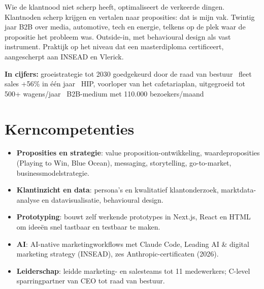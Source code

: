 \documentclass[11pt,a4paper,sans]{moderncv}
\begin{document}
\makecvtitle


\vspace{6pt}
\small{Wie de klantnood niet scherp heeft, optimaliseert de verkeerde dingen. Klantnoden scherp krijgen en vertalen naar proposities: dat is mijn vak. Twintig jaar B2B over media, automotive, tech en energie, telkens op de plek waar de propositie het probleem was. Outside-in, met behavioural design als vast instrument. Praktijk op het niveau dat een masterdiploma certificeert, aangescherpt aan INSEAD en Vlerick.}

\vspace{4pt}
\small{\textbf{In cijfers:} groeistrategie tot 2030 goedgekeurd door de raad van bestuur \textperiodcentered\ fleet sales +56\% in \'e\'en jaar \textperiodcentered\ HIP, voorloper van het cafetariaplan, uitgegroeid tot 500+ wagens/jaar \textperiodcentered\ B2B-medium met 110.000 bezoekers/maand}


\section{Kerncompetenties}
\vspace{1pt}
\begin{itemize}

\item \textbf{Proposities en strategie}: value proposition-ontwikkeling, waardeproposities (Playing to Win, Blue Ocean), messaging, storytelling, go-to-market, businessmodelstrategie.

\item \textbf{Klantinzicht en data}: persona's en kwalitatief klantonderzoek, marktdata-analyse en datavisualisatie, behavioural design.

\item \textbf{Prototyping}: bouwt zelf werkende prototypes in Next.js, React en HTML om idee\"en snel tastbaar en testbaar te maken.

\item \textbf{AI}: AI-native marketingworkflows met Claude Code, Leading AI \& digital marketing strategy (INSEAD), zes Anthropic-certificaten (2026).

\item \textbf{Leiderschap}: leidde marketing- en salesteams tot 11 medewerkers; C-level sparringpartner van CEO tot raad van bestuur.

\end{itemize}
\end{document}
